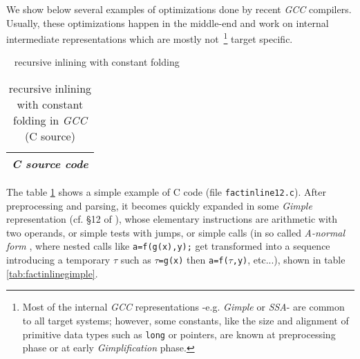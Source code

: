 We show below several examples of optimizations done by recent
\emph{GCC} compilers. Usually, these optimizations happen in the
middle-end and work on internal intermediate representations which are
mostly not~\footnote{Most of the internal \emph{GCC} representations
  -e.g. \emph{Gimple} or \emph{SSA}- are common to all target systems;
  however, some constants, like the size and alignment of primitive
  data types such as \texttt{long} or pointers, are known at
  preprocessing phase or at early \emph{Gimplification} phase.} target
specific.

\bigskip

\bigskip

{{\raisebox{3pt}{\textcolor{brown}{\rule{0.2\textwidth}{2.0pt}}}} ~ \large{recursive inlining with constant folding}}



\begin{table}[!htbp]
\caption{\label{tab:factinlinecsrc} recursive inlining with constant folding in \emph{GCC} (C source)}
   \medskip
  \begin{center}
    \begin{relsize}{-1.2}
     \begin{tabular}{c}
       \\ 
       \textbf{\emph{C source code}} \\ 
       \hline
     \end{tabular}
    \end{relsize}
  \end{center}
\end{table}

The table \ref{tab:factinlinecsrc} shows a simple example of C code
(file \texttt{factinline12.c}). After preprocessing and parsing, it
becomes quickly expanded in some \emph{Gimple}
representation (cf. §12 of \cite{gcc-internals}), whose elementary
instructions are arithmetic with two operands, or simple tests with
jumps, or simple calls (in so called \emph{A-normal form}
, where nested calls like \verb+a=f(g(x),y);+ get
transformed into a sequence introducing a temporary $\tau$ such as
$\tau$\verb+=g(x)+ then \verb+a=f(+$\tau$\verb+,y)+, etc...), shown in
table \ref{tab:factinlinegimple}.



